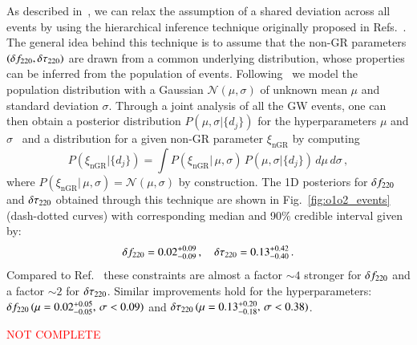 As described in~\cite{Abbott:2020jks}, we can relax the assumption of a shared deviation across all events by using the hierarchical inference technique originally proposed in Refs.~\cite{Zimmerman:2019wzo,Isi:2019asy}. The general idea behind this technique is to assume that the non-GR parameters $(\delta f_{\text{220}},\delta \tau_{\text{220}})$ are drawn from a common underlying distribution, whose properties can be inferred from the population of events. Following~\cite{Zimmerman:2019wzo,Isi:2019asy,Abbott:2020jks} we model the population distribution with a Gaussian  $\mathcal{N}(\mu,\sigma)$ of unknown mean $\mu$ and standard deviation $\sigma$. Through a joint analysis of all the GW events, one can then obtain a posterior distribution $P(\mu, \sigma |  \{d_j\}) $ for the hyperparameters $\mu$ and $\sigma$~\cite{Isi:2019asy} and a distribution for a given non-GR parameter $\xi_{\text{nGR}}$ by computing~\cite{Isi:2019asy}
%
\begin{equation}
P(\xi_{\text{nGR}} | \{d_j\}) = \int P(\xi_{\text{nGR}} |\, \mu, \sigma)\,P(\mu, \sigma |  \{d_j\})\,d\mu\,d\sigma \,,
\end{equation}
%
where $P(\xi_{\text{nGR}} | \,\mu, \sigma) = \mathcal{N}(\mu,\sigma)$ by construction. The 1D posteriors for $\delta f_{\text{220}}$ and $ \delta \tau_{\text{220}}$ obtained through this technique are shown in Fig.~\ref{fig:o1o2_events} (dash-dotted curves) with corresponding median and 90\% credible interval given by: 
%
\begin{equation}
\delta f_{\text{220}}=0.02^{+0.09}_{-0.09}\,,\quad \delta \tau_{\text{220}}=0.13^{+0.42}_{-0.40}\,.
\end{equation}
Compared to Ref.~\cite{Abbott:2020jks} these constraints are almost a factor $\sim 4$ stronger for $\delta f_{\text{220}}$ and a factor $\sim 2$ for $\delta \tau_{\text{220}}$. Similar improvements hold for the hyperparameters: $\delta f_{\text{220}}\,(\mu=0.02^{+0.05}_{-0.05},\,\sigma<0.09)$ and $\delta \tau_{\text{220}}\,(\mu=0.13^{+0.20}_{-0.18},\,\sigma<0.38)$.


\begin{table}

\caption{\textcolor{red}{NOT COMPLETE} }
\label{tab:qnm_o1o2_results}
\end{table}

